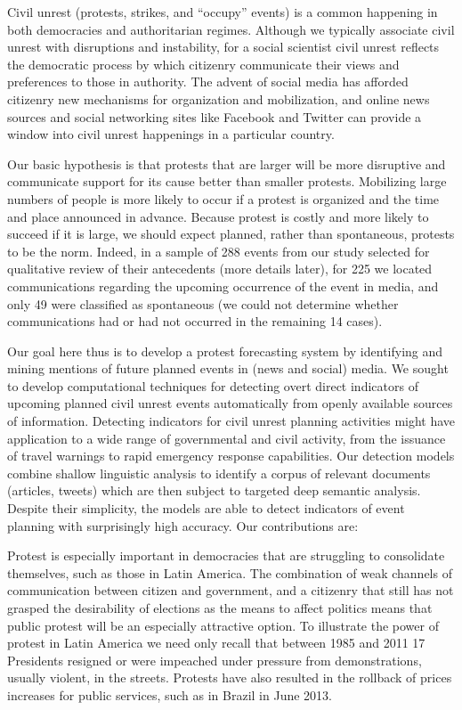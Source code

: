 Civil unrest (protests, strikes, and ``occupy'' events) is a common happening in both democracies
and authoritarian regimes.
Although we typically associate civil unrest with disruptions and instability, for a social scientist
civil unrest reflects the democratic process by 
which citizenry communicate their views and preferences to those in authority. 
The advent of social
media has afforded citizenry new mechanisms for organization and mobilization, and online news sources
and social networking sites like Facebook and Twitter
can provide a window into civil unrest happenings in a particular country.

Our basic hypothesis is that
protests that are larger will be more disruptive and communicate support for its cause better than smaller protests. 
Mobilizing large numbers of people is more likely to occur if a protest is organized and the time and place announced in
advance. Because protest is costly and more likely to succeed if it is large, we should expect planned, rather than 
spontaneous, protests to be the norm. Indeed, in a sample of 288 events from our study selected for qualitative review of their antecedents
(more details later), for 225 we located communications regarding the upcoming occurrence of the event in media, and only 49 were classified as 
spontaneous (we could not determine whether communications had or had not occurred in the remaining 14 cases).

Our goal here thus is to develop a protest forecasting system by identifying and mining mentions of future planned events
in (news and social) media.
We sought to develop
computational techniques for detecting overt direct indicators
of upcoming planned civil unrest events automatically from openly
available sources of information.  Detecting indicators for civil
unrest planning activities might have application to a wide range of
governmental and civil activity, from the issuance of travel warnings
to rapid emergency response capabilities.  Our detection models 
combine shallow linguistic analysis to identify a corpus of relevant
documents (articles, tweets) which are then subject to targeted deep semantic analysis.
Despite their simplicity, the models are able to
detect indicators of event planning with surprisingly high
accuracy. Our contributions are:



Protest is especially important in democracies that are struggling to consolidate themselves, such as those in Latin America. The combination of weak channels of communication between citizen and government, and a citizenry that still has not grasped the desirability of elections as the means to affect politics means that public protest will be an especially attractive option. To illustrate the power of protest in Latin America we need only recall that between 1985 and 2011 17 Presidents resigned or were impeached under pressure from demonstrations, usually violent, in the streets. Protests have also resulted in the rollback of prices increases for public services, such as in Brazil in June 2013.


